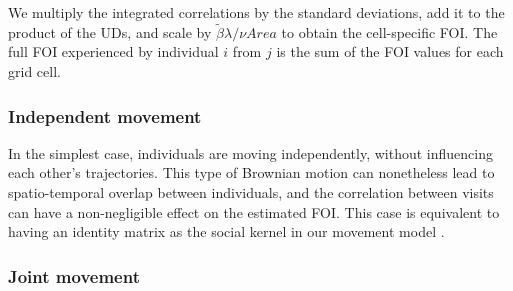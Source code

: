 \documentclass[letterpaper]{article}
\begin{document}
We multiply the integrated correlations by the standard deviations, add it to the product of the UDs, and scale by $\tilde\beta\lambda/\nu Area$ to obtain the cell-specific FOI. The full FOI experienced by individual $i$ from $j$ is the sum of the FOI values for each grid cell. 

\subsubsection*{Independent movement}

In the simplest case, individuals are moving independently, without influencing each other's trajectories. This type of Brownian motion can nonetheless lead to spatio-temporal overlap between individuals, and the correlation between visits can have a non-negligible effect on the estimated FOI. 
This case is equivalent to having an identity matrix as the social kernel in our movement model \citep{Scharf2018}.

\subsubsection*{Joint movement}
\end{document}
